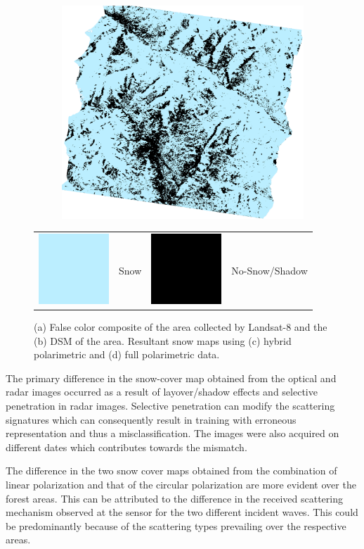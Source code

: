 \begin{figure}
\begin{subfigure}[b]{0.45\columnwidth}
\includegraphics[width=\textwidth]{Figures/SnowCover2018/Lin} 
\caption{}
\end{subfigure}
\begin{tabular}{cccc}
\includegraphics[width=0.04\columnwidth]{Figures/SnowCover2018/Snow} & Snow & \includegraphics[width=0.04\columnwidth]{Figures/SnowCover2018/NoSnow} & No-Snow/Shadow
\end{tabular}
\vspace{3em}
\caption{(a) False color composite of the area collected by Landsat-8 and the (b) DSM of the area. Resultant snow maps using (c) hybrid polarimetric and (d) full polarimetric data.}
\label{fig:results}
\end{figure}

The primary difference in the snow-cover map obtained from the optical and radar images occurred as a result of layover/shadow effects and selective penetration in radar images. Selective penetration can modify the scattering signatures which can consequently result in training with erroneous representation and thus a misclassification. The images were also acquired on different dates which contributes towards the mismatch.          

The difference in the two snow cover maps obtained from the combination of linear polarization and that of the circular polarization are more evident over the forest areas. This can be attributed to the difference in the received scattering mechanism observed at the sensor for the two different incident waves. This could be predominantly because of the scattering types prevailing over the respective areas. 

